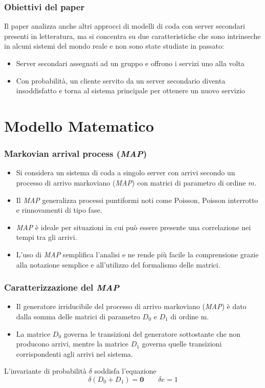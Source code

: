 \documentclass{beamer}
\begin{document}
\begin{frame}
    \frametitle{Obiettivi del paper}
    Il paper analizza anche altri approcci di modelli di coda con server secondari presenti in letteratura, ma si concentra su due caratteristiche che sono intrinseche in alcuni sistemi del mondo reale e non sono state studiate in passato:
    \begin{block}{}
    \begin{itemize}
        \item Server secondari assegnati ad un gruppo e offrono i servizi uno alla volta
        \item Con probabilità, un cliente servito da un server secondario diventa insoddisfatto e torna al sistema principale per ottenere un nuovo servizio
    \end{itemize}
    \end{block}
\end{frame}

\section{Modello Matematico}

\begin{frame}
    \frametitle{Markovian arrival process (\emph{MAP})}
    \begin{itemize}
        \item Si considera un sistema di coda a singolo server con arrivi secondo un processo di arrivo markoviano (\emph{MAP}) con matrici di parametro di ordine $m$.
        \item Il \emph{MAP} generalizza processi puntiformi noti come Poisson, Poisson interrotto e rinnovamenti di tipo fase.
        \item \emph{MAP} è ideale per situazioni in cui può essere presente una correlazione nei tempi tra gli arrivi.
        \item L'uso di \emph{MAP} semplifica l'analisi e ne rende più facile la comprensione grazie alla notazione semplice e all'utilizzo del formalismo delle matrici.
    \end{itemize}
\end{frame}

\begin{frame}
    \frametitle{Caratterizzazione del \emph{MAP}}
    \begin{itemize}
        \item Il generatore irriducibile del processo di arrivo markoviano (\emph{MAP}) è dato dalla somma delle matrici di parametro $D_0$ e $D_1$ di ordine m.
        \item La matrice $D_0$ governa le transizioni del generatore sottostante che non producono arrivi, mentre la matrice $D_1$ governa quelle transizioni corrispondenti agli arrivi nel sistema.
    \end{itemize}
    \begin{block}{}
        L'invariante di probabilità $\delta$ soddisfa l'equazione
        $$\delta (D_0 + D_1) = \textbf{0} \qquad \delta e = 1$$
    \end{block}
\end{frame}
\end{document}
